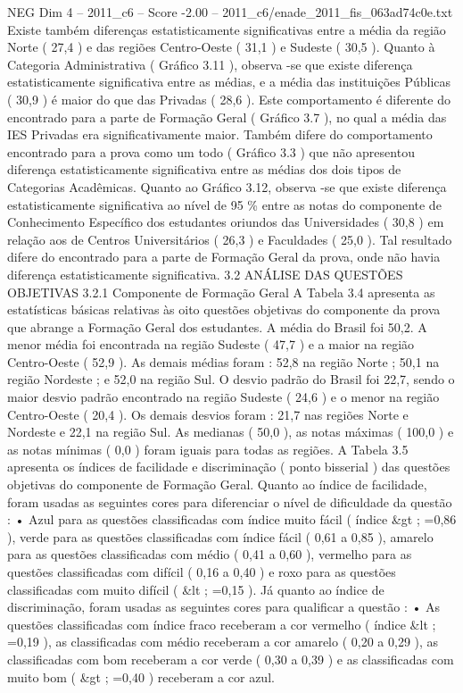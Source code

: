 \begin{textsample}{NEG Dim 4 – 2011\_c6 – Score -2.00 – 2011\_c6/enade\_2011\_fis\_063ad74c0e.txt}
Existe também diferenças estatisticamente significativas entre a média da região Norte ( 27,4 ) e das regiões Centro-Oeste ( 31,1 ) e Sudeste ( 30,5 ).
Quanto à Categoria Administrativa ( Gráfico 3.11 ), observa -se que existe diferença estatisticamente significativa entre as médias, e a média das instituições Públicas ( 30,9 ) é maior do que das Privadas ( 28,6 ).
Este comportamento é diferente do encontrado para a parte de Formação Geral ( Gráfico 3.7 ), no qual a média das IES Privadas era significativamente maior.
Também difere do comportamento encontrado para a prova como um todo ( Gráfico 3.3 ) que não apresentou diferença estatisticamente significativa entre as médias dos dois tipos de Categorias Acadêmicas.
Quanto ao Gráfico 3.12, observa -se que existe diferença estatisticamente significativa ao nível de 95 \% entre as notas do componente de Conhecimento Específico dos estudantes oriundos das Universidades ( 30,8 ) em relação aos de Centros Universitários ( 26,3 ) e Faculdades ( 25,0 ).
Tal resultado difere do encontrado para a parte de Formação Geral da prova, onde não havia diferença estatisticamente significativa. 3.2 ANÁLISE DAS QUESTÕES OBJETIVAS 3.2.1 Componente de Formação Geral A Tabela 3.4 apresenta as estatísticas básicas relativas às oito questões objetivas do componente da prova que abrange a Formação Geral dos estudantes.
A média do Brasil foi 50,2.
A menor média foi encontrada na região Sudeste ( 47,7 ) e a maior na região Centro-Oeste ( 52,9 ).
As demais médias foram : 52,8 na região Norte ; 50,1 na região Nordeste ; e 52,0 na região Sul.
O desvio padrão do Brasil foi 22,7, sendo o maior desvio padrão encontrado na região Sudeste ( 24,6 ) e o menor na região Centro-Oeste ( 20,4 ).
Os demais desvios foram : 21,7 nas regiões Norte e Nordeste e 22,1 na região Sul.
As medianas ( 50,0 ), as notas máximas ( 100,0 ) e as notas mínimas ( 0,0 ) foram iguais para todas as regiões.
A Tabela 3.5 apresenta os índices de facilidade e discriminação ( ponto bisserial ) das questões objetivas do componente de Formação Geral.
Quanto ao índice de facilidade, foram usadas as seguintes cores para diferenciar o nível de dificuldade da questão : • Azul para as questões classificadas com índice muito fácil ( índice \&gt ; =0,86 ), verde para as questões classificadas com índice fácil ( 0,61 a 0,85 ), amarelo para as questões classificadas com médio ( 0,41 a 0,60 ), vermelho para as questões classificadas com difícil ( 0,16 a 0,40 ) e roxo para as questões classificadas com muito difícil ( \&lt ; =0,15 ).
Já quanto ao índice de discriminação, foram usadas as seguintes cores para qualificar a questão : • As questões classificadas com índice fraco receberam a cor vermelho ( índice \&lt ; =0,19 ), as classificadas com médio receberam a cor amarelo ( 0,20 a 0,29 ), as classificadas com bom receberam a cor verde ( 0,30 a 0,39 ) e as classificadas com muito bom ( \&gt ; =0,40 ) receberam a cor azul.

\end{textsample}
